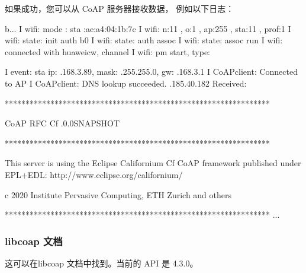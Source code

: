 \documentclass[a4paper,12pt,english]{sphinxmanual}
\begin{document}
{{\sphinxAtStartPar
如果成功，您可以从 CoAP 服务器接收数据，
例如以下日志：

\begin{sphinxVerbatim}[commandchars=\\\{\}]
b...
I  wifi: mode : sta :ae:a4:04:1b:7c
I  wifi: n:11 , o:1 , ap:255 , sta:11 , prof:1
I  wifi: state: init \PYGZhy{}\PYGZgt{} auth b0
I  wifi: state: auth \PYGZhy{}\PYGZgt{} assoc 
I  wifi: state: assoc \PYGZhy{}\PYGZgt{} run 
I  wifi: connected with huawei\PYGZus{}cw, channel 
I  wifi: pm start, type: 

I  event: sta ip: .168.3.89, mask: .255.255.0, gw: .168.3.1
I  CoAP\PYGZus{}client: Connected to AP
I  CoAP\PYGZus{}client: DNS lookup succeeded. .185.40.182
Received:

****************************************************************

CoAP RFC                                   Cf .0.0\PYGZhy{}SNAPSHOT

****************************************************************

This server is using the Eclipse Californium Cf CoAP framework
published under EPL+EDL: http://www.eclipse.org/californium/

c \PYGZhy{}2020 Institute  Pervasive Computing, ETH Zurich and others

****************************************************************
...
\end{sphinxVerbatim}


\subsubsection{libcoap 文档}
\label{\detokenize{exp-esp32/coap:libcoap}}
\sphinxAtStartPar
这可以在libcoap 文档中找到。当前的 API 是 4.3.0。

}}
\end{document}
